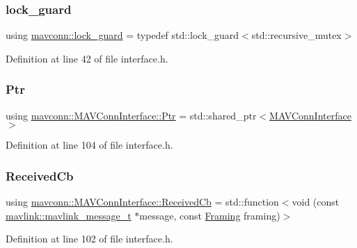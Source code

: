 \subsubsection{\texorpdfstring{lock\_guard}{lock\_guard}}
{\footnotesize\ttfamily using \mbox{\hyperlink{group__mavconn_ga46feb20496b24d733abd4e68ef29bc90}{mavconn\+::lock\+\_\+guard}} = typedef std\+::lock\+\_\+guard$<$std\+::recursive\+\_\+mutex$>$}



Definition at line 42 of file interface.\+h.

\mbox{\label{group__mavconn_gaff41078b805e1d8f85ed6fd2d87711ce}} 
\subsubsection{\texorpdfstring{Ptr}{Ptr}}
{\footnotesize\ttfamily using \mbox{\hyperlink{group__mavconn_gaff41078b805e1d8f85ed6fd2d87711ce}{mavconn\+::\+M\+A\+V\+Conn\+Interface\+::\+Ptr}} =  std\+::shared\+\_\+ptr$<$\mbox{\hyperlink{classmavconn_1_1MAVConnInterface}{M\+A\+V\+Conn\+Interface}}$>$}



Definition at line 104 of file interface.\+h.

\mbox{\label{group__mavconn_ga1d04ead963f1685f3aaf4b18ffb49ff7}} 
\subsubsection{\texorpdfstring{ReceivedCb}{ReceivedCb}}
{\footnotesize\ttfamily using \mbox{\hyperlink{group__mavconn_ga1d04ead963f1685f3aaf4b18ffb49ff7}{mavconn\+::\+M\+A\+V\+Conn\+Interface\+::\+Received\+Cb}} =  std\+::function$<$void (const \mbox{\hyperlink{include__v0_89_2mavlink__types_8h_a63b963764c09dc72f4910c1521e325b9}{mavlink\+::mavlink\+\_\+message\+\_\+t}} $\ast$message, const \mbox{\hyperlink{group__mavconn_gac93e6f8262bcc6008b4882ae6213f494}{Framing}} framing)$>$}



Definition at line 102 of file interface.\+h.

\mbox{\label{group__mavconn_gab7fe4e29d643505aafb15c532a9338d3}} 
